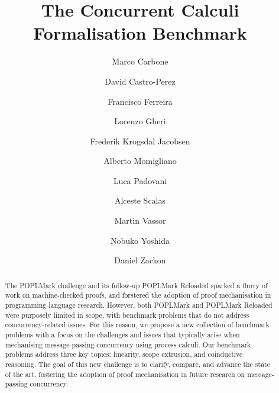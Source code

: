 \documentclass[runningheads]{llncs}
\begin{document}
\title{The Concurrent Calculi Formalisation Benchmark}

\author{
     Marco Carbone 
\and David Castro-Perez 
\and Francisco Ferreira 
\and Lorenzo Gheri 
\and Frederik Krogsdal Jacobsen 
\and Alberto Momigliano 
\and Luca Padovani 
\and Alceste Scalas 
\and Martin Vassor 
\and Nobuko Yoshida 
\and Daniel Zackon 
}



\maketitle

\begin{abstract}
  The POPLMark challenge and its follow-up POPLMark Reloaded sparked a flurry of
  work on machine-checked proofs, and forstered the adoption of proof
  mechanisation in programming language research.  However, both POPLMark and
  POPLMark Reloaded were purposely limited in scope, with benchmark problems
  that do not address concurrency-related issues.
  For this reason, we propose a new collection of benchmark problems with a
  focus on the challenges and issues that typically arise when mechanising
  message-passing concurrency using process calculi.  Our benchmark problems
  address three key topics: linearity, scope extrusion, and coinductive
  reasoning.  The goal of this new challenge is to clarify, compare, and advance
  the state of the art, fostering the adoption of proof mechanisation in future
  research on message-passing concurrency.

\end{abstract}
\end{document}
